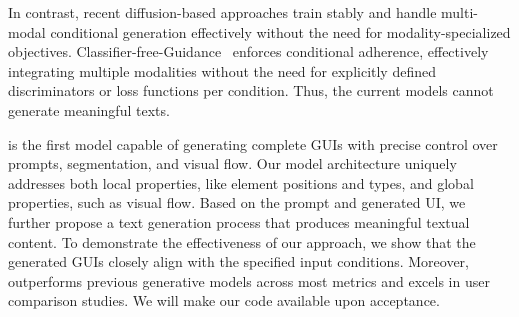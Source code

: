 In contrast, recent diffusion-based approaches train stably and handle multi-modal conditional generation effectively without the need for modality-specialized objectives.  
Classifier-free-Guidance~\cite{cfg} enforces conditional adherence, effectively integrating multiple modalities without the need for explicitly defined discriminators or loss functions per condition. 
Thus, the current models cannot generate meaningful texts.


\systemname is the first model capable of generating complete GUIs with precise control over prompts, segmentation, and visual flow. Our model architecture uniquely addresses both local properties, like element positions and types, and global properties, such as visual flow. Based on the prompt and generated UI, we further propose a text generation process that produces meaningful textual content. To demonstrate the effectiveness of our approach, we show that the generated GUIs closely align with the specified input conditions. Moreover, \systemname outperforms previous generative models across most metrics and excels in user comparison studies.
We will make our code available upon acceptance.

